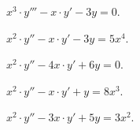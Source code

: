 \begin{problem}
	$x^3 \cdot y''' - x \cdot y' - 3 y = 0$.
\end{problem}

\begin{problem}
	$x^2 \cdot y'' - x \cdot y' - 3 y = 5 x^4$.
\end{problem}

\begin{problem}
	$x^2 \cdot y'' - 4 x \cdot y' + 6 y = 0$.
\end{problem}

\begin{problem}
	$x^2 \cdot y'' - x \cdot y' + y = 8 x^3$.
\end{problem}

\begin{problem}
	$x^2 \cdot y'' - 3 x \cdot y' + 5 y = 3 x^2$.
\end{problem}

